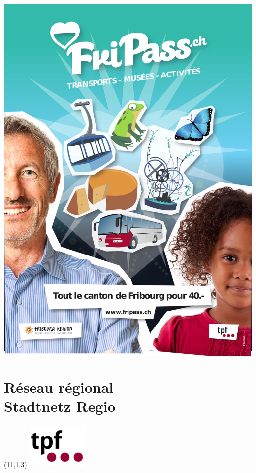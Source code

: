 \clearpage%
\ifodd\value{page}\hbox{}\newpage\fi%
\thispagestyle{empty}%
\includegraphics[width=\textwidth]{fripass.jpg}
\clearpage
\section*{Réseau régional\\Stadtnetz Regio}
\begin{textblock}{2}(11,1.3)
\includegraphics[width=3cm]{tpf.pdf}
\end{textblock}
\clearpage%
\thispagestyle{empty}%
